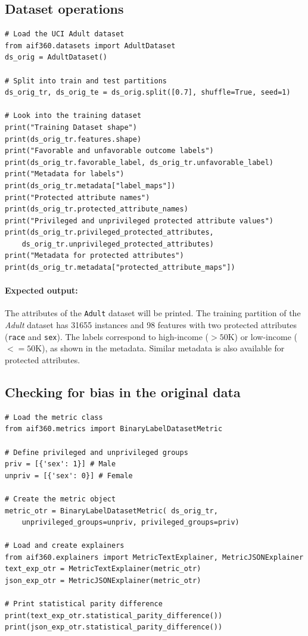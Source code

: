 \documentclass{article}
\begin{document}
\subsection{Dataset operations}
\begin{verbatim}
# Load the UCI Adult dataset
from aif360.datasets import AdultDataset
ds_orig = AdultDataset()

# Split into train and test partitions
ds_orig_tr, ds_orig_te = ds_orig.split([0.7], shuffle=True, seed=1)

# Look into the training dataset
print("Training Dataset shape")
print(ds_orig_tr.features.shape)
print("Favorable and unfavorable outcome labels")
print(ds_orig_tr.favorable_label, ds_orig_tr.unfavorable_label)
print("Metadata for labels")
print(ds_orig_tr.metadata["label_maps"])
print("Protected attribute names")
print(ds_orig_tr.protected_attribute_names)
print("Privileged and unprivileged protected attribute values")
print(ds_orig_tr.privileged_protected_attributes, 
    ds_orig_tr.unprivileged_protected_attributes)
print("Metadata for protected attributes")
print(ds_orig_tr.metadata["protected_attribute_maps"])

\end{verbatim}

\paragraph{Expected output:} The attributes of the \texttt{Adult} dataset will be printed. The training partition of the \textit{Adult} dataset has 31655 instances and 98 features with two protected attributes (\texttt{race} and \texttt{sex}). The labels correspond to high-income ($>50$K) or low-income ($<=50$K), as shown in the metadata. Similar metadata is also available for protected attributes.

\subsection{Checking for bias in the original data}
\begin{verbatim}
# Load the metric class
from aif360.metrics import BinaryLabelDatasetMetric

# Define privileged and unprivileged groups
priv = [{'sex': 1}] # Male
unpriv = [{'sex': 0}] # Female

# Create the metric object
metric_otr = BinaryLabelDatasetMetric( ds_orig_tr, 
    unprivileged_groups=unpriv, privileged_groups=priv)
        
# Load and create explainers
from aif360.explainers import MetricTextExplainer, MetricJSONExplainer
text_exp_otr = MetricTextExplainer(metric_otr)
json_exp_otr = MetricJSONExplainer(metric_otr)
        
# Print statistical parity difference
print(text_exp_otr.statistical_parity_difference())
print(json_exp_otr.statistical_parity_difference())
\end{verbatim}
\end{document}
